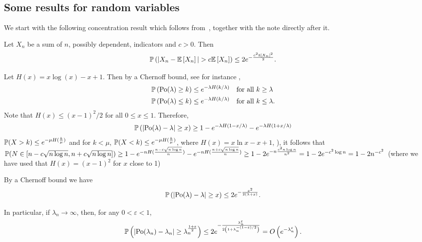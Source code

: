 \begin{appendices}
\section{Some results for random variables}

We start with the following concentration result which follows from~\cite[Theorem 4]{freedman1973another}, together with the note directly after it.

\begin{lemma}\label{lem:general_concentration_sum_indicators}
Let $X_n$ be a sum of $n$, possibly dependent, indicators and $c > 0$. Then
\[
	\mathbb{P}\left(|X_n - \mathbb{E}\left[X_n\right]| > c \mathbb{E}\left[X_n\right]\right) \le 2 e^{-\frac{c^2 \mathbb{E}\left[X_n\right]^2}{2}}.
\]
\end{lemma}

Let $H(x) = x\log(x) - x + 1$. Then by a Chernoff bound, see for instance \cite[Lemma 1.2]{penrose2003random},
\begin{align*}
	&\mathbb{P}\left({\mathrm{Po}}(\lambda) \ge k\right) \le e^{-\lambda H(k/\lambda)} \quad \text{for all } k \ge \lambda\\
	&\mathbb{P}\left({\mathrm{Po}}(\lambda) \le k\right) \le e^{-\lambda H(k/\lambda)} \quad \text{for all } k \le \lambda.
\end{align*}
Note that $H(x) \le (x-1)^2/2$ for all $0 \le x \le 1$. Therefore, 
\begin{align*}
	\mathbb{P}\left(\left|\mathrm{Po}(\lambda) - \lambda\right| \ge x\right) \ge 1 - e^{-\lambda H(1 - x/\lambda)} - e^{-\lambda H(1 + x/\lambda)}
\end{align*}
 $\mathbb{P}(X >k) \leq e^{-\mu H(\frac{k}{\mu})}$ and for $k<\mu$, $\mathbb{P}(X< k) \leq e^{-\mu H(\frac{k}{\mu})}$, where $H(x) = x\ln x -x+1$, \cite{penrose2003random}), it follows that $\mathbb{P}(N \in [n-c\sqrt{n\log n},n+c\sqrt{n\log n}]) \geq 1-e^{-n H(\frac{n-c\sqrt{n\log n}}{n})}-e^{-nH(\frac{n+c\sqrt{n \log n}}{n})} \geq  1-2e^{-n \frac{c^2 n \log n}{n^2}} = 1-2e^{-c^2\log n}=1-2n^{-c^2}$ (where we have used that $H(x) = (x-1)^2$ for $x$ close to 1)

By a Chernoff bound we have
\begin{equation}\label{eq:def_chernoff_bound_poisson}
	\mathbb{P}\left(\left|\mathrm{Po}(\lambda) - \lambda\right| \ge x\right) \le 2e^{-\frac{x^2}{2(\lambda + x)}}.
\end{equation}

In particular, if $\lambda_n \to \infty$, then, for any $0 < \varepsilon < 1$,
\[
	\mathbb{P}\left(\left|\mathrm{Po}(\lambda_n) - \lambda_n\right| \ge \lambda_n^{\frac{1+\varepsilon}{2}}\right) \le 2e^{-\frac{\lambda_n^\varepsilon}{2\left(1 + \lambda_n^{-(1 - \varepsilon)/2}\right)}}
	= O\left(e^{-\lambda_n^\varepsilon}\right).
\]




\end{appendices}
